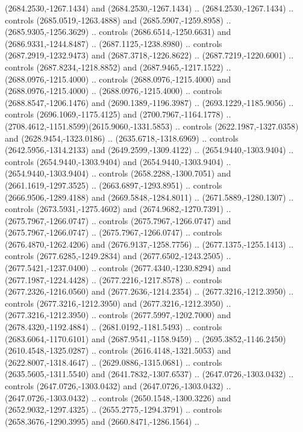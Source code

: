\begin{scope}[shift={(28.3138,-376.6591)}]
\begin{scope}[shift={(-2186.6262,1813.8454)}]
      (2684.2530,-1267.1434) and (2684.2530,-1267.1434) .. (2684.2530,-1267.1434) ..
      controls (2685.0519,-1263.4888) and (2685.5907,-1259.8958) ..
      (2685.9305,-1256.3629) .. controls (2686.6514,-1250.6631) and
      (2686.9331,-1244.8487) .. (2687.1125,-1238.8980) .. controls
      (2687.2919,-1232.9473) and (2687.3718,-1226.8622) .. (2687.7219,-1220.6001) ..
      controls (2687.8234,-1218.8852) and (2687.9465,-1217.1522) ..
      (2688.0976,-1215.4000) .. controls (2688.0976,-1215.4000) and
      (2688.0976,-1215.4000) .. (2688.0976,-1215.4000) .. controls
      (2688.8547,-1206.1476) and (2690.1389,-1196.3987) .. (2693.1229,-1185.9056) ..
      controls (2696.1069,-1175.4125) and (2700.7967,-1164.1778) ..
      (2708.4612,-1151.8599)(2615.9060,-1331.5853) .. controls
      (2622.1987,-1327.0358) and (2628.9454,-1323.0186) .. (2635.6718,-1318.6969) ..
      controls (2642.5956,-1314.2133) and (2649.2599,-1309.4122) ..
      (2654.9440,-1303.9404) .. controls (2654.9440,-1303.9404) and
      (2654.9440,-1303.9404) .. (2654.9440,-1303.9404) .. controls
      (2658.2288,-1300.7051) and (2661.1619,-1297.3525) .. (2663.6897,-1293.8951) ..
      controls (2666.9506,-1289.4188) and (2669.5848,-1284.8011) ..
      (2671.5889,-1280.1307) .. controls (2673.5931,-1275.4602) and
      (2674.9682,-1270.7391) .. (2675.7967,-1266.0747) .. controls
      (2675.7967,-1266.0747) and (2675.7967,-1266.0747) .. (2675.7967,-1266.0747) ..
      controls (2676.4870,-1262.4206) and (2676.9137,-1258.7756) ..
      (2677.1375,-1255.1413) .. controls (2677.6285,-1249.2834) and
      (2677.6502,-1243.2505) .. (2677.5421,-1237.0400) .. controls
      (2677.4340,-1230.8294) and (2677.1987,-1224.4428) .. (2677.2216,-1217.8578) ..
      controls (2677.2326,-1216.0560) and (2677.2636,-1214.2354) ..
      (2677.3216,-1212.3950) .. controls (2677.3216,-1212.3950) and
      (2677.3216,-1212.3950) .. (2677.3216,-1212.3950) .. controls
      (2677.5997,-1202.7000) and (2678.4320,-1192.4884) .. (2681.0192,-1181.5493) ..
      controls (2683.6064,-1170.6101) and (2687.9541,-1158.9459) ..
      (2695.3852,-1146.2450)(2610.4548,-1325.0287) .. controls
      (2616.4148,-1321.5053) and (2622.8007,-1318.4647) .. (2629.0886,-1315.0681) ..
      controls (2635.5605,-1311.5540) and (2641.7832,-1307.6537) ..
      (2647.0726,-1303.0432) .. controls (2647.0726,-1303.0432) and
      (2647.0726,-1303.0432) .. (2647.0726,-1303.0432) .. controls
      (2650.1548,-1300.3226) and (2652.9032,-1297.4325) .. (2655.2775,-1294.3791) ..
      controls (2658.3676,-1290.3995) and (2660.8471,-1286.1564) ..

\end{scope}
\end{scope}
